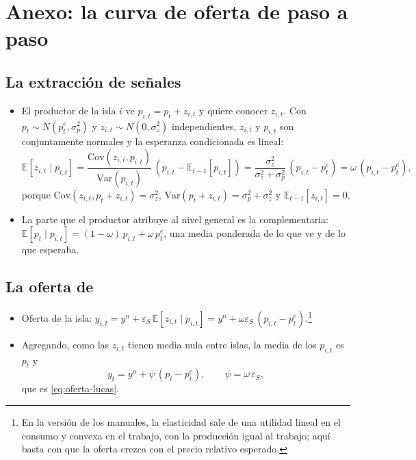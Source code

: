 \documentclass[11pt]{article}
\begin{document}
\clearpage
\appendix

\section{Anexo: la curva de oferta de  paso a paso}\label{anexo:lucas}

\subsection{La extracción de señales}

\begin{itemize}
\item El productor de la isla $i$ ve $p_{i,t}=p_t+z_{i,t}$ y quiere conocer $z_{i,t}$. Con $p_t\sim N(p^e_t,\sigma^2_p)$ y $z_{i,t}\sim N(0,\sigma^2_z)$ independientes, $z_{i,t}$ y $p_{i,t}$ son conjuntamente normales y la esperanza condicionada es lineal:
  \begin{equation*}
  \mathbb{E}[z_{i,t}\mid p_{i,t}]=\frac{\mathrm{Cov}(z_{i,t},p_{i,t})}{\mathrm{Var}(p_{i,t})}\,\left(p_{i,t}-\mathbb{E}_{t-1}[p_{i,t}]\right)=\frac{\sigma^2_z}{\sigma^2_z+\sigma^2_p}\,\left(p_{i,t}-p^e_t\right)=\omega\,\left(p_{i,t}-p^e_t\right),
  \end{equation*}
  porque $\mathrm{Cov}(z_{i,t},p_t+z_{i,t})=\sigma^2_z$, $\mathrm{Var}(p_t+z_{i,t})=\sigma^2_p+\sigma^2_z$ y $\mathbb{E}_{t-1}[z_{i,t}]=0$.
\item La parte que el productor atribuye al nivel general es la complementaria: $\mathbb{E}[p_t\mid p_{i,t}]=(1-\omega)\,p_{i,t}+\omega\,p^e_t$, una media ponderada de lo que ve y de lo que esperaba.
\end{itemize}

\subsection{La oferta de }

\begin{itemize}
\item Oferta de la isla: $y_{i,t}=y^n+\varepsilon_S\,\mathbb{E}[z_{i,t}\mid p_{i,t}]=y^n+\omega\varepsilon_S\,\left(p_{i,t}-p^e_t\right)$.\footnote{En la versión de los manuales\nocite{Romer2019Advanced}, la elasticidad sale de una utilidad lineal en el consumo y convexa en el trabajo, con la producción igual al trabajo; aquí basta con que la oferta crezca con el precio relativo esperado.}
\item Agregando, como las $z_{i,t}$ tienen media nula entre islas, la media de los $p_{i,t}$ es $p_t$ y
  \begin{equation*}
  y_t=y^n+\psi\,\left(p_t-p^e_t\right),\qquad \psi=\omega\,\varepsilon_S,
  \end{equation*}
  que es \eqref{eq:oferta-lucas}.
\end{itemize}
\findemo
\end{document}
